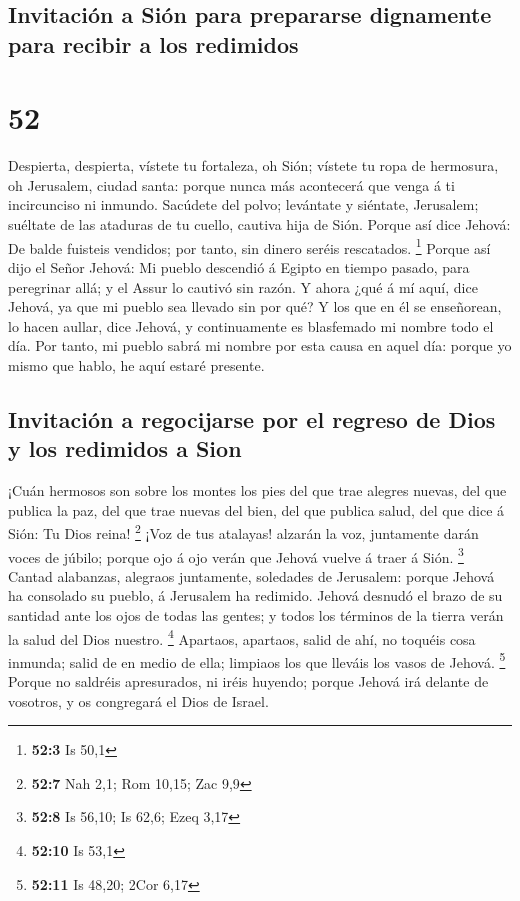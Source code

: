 \hypertarget{invitaciuxf3n-a-siuxf3n-para-prepararse-dignamente-para-recibir-a-los-redimidos}{%
\subsection{Invitación a Sión para prepararse dignamente para recibir a
los
redimidos}\label{invitaciuxf3n-a-siuxf3n-para-prepararse-dignamente-para-recibir-a-los-redimidos}}

\hypertarget{section-51}{%
\section{52}\label{section-51}}

 Despierta, despierta, vístete tu fortaleza, oh Sión;
vístete tu ropa de hermosura, oh Jerusalem, ciudad santa: porque nunca
más acontecerá que venga á ti incircunciso ni inmundo. 
Sacúdete del polvo; levántate y siéntate, Jerusalem; suéltate de las
ataduras de tu cuello, cautiva hija de Sión.  Porque así
dice Jehová: De balde fuisteis vendidos; por tanto, sin dinero seréis
rescatados. \footnote{\textbf{52:3} Is 50,1}  Porque así
dijo el Señor Jehová: Mi pueblo descendió á Egipto en tiempo pasado,
para peregrinar allá; y el Assur lo cautivó sin razón.  Y
ahora ¿qué á mí aquí, dice Jehová, ya que mi pueblo sea llevado sin por
qué? Y los que en él se enseñorean, lo hacen aullar, dice Jehová, y
continuamente es blasfemado mi nombre todo el día.  Por
tanto, mi pueblo sabrá mi nombre por esta causa en aquel día: porque yo
mismo que hablo, he aquí estaré presente.

\hypertarget{invitaciuxf3n-a-regocijarse-por-el-regreso-de-dios-y-los-redimidos-a-sion}{%
\subsection{Invitación a regocijarse por el regreso de Dios y los
redimidos a
Sion}\label{invitaciuxf3n-a-regocijarse-por-el-regreso-de-dios-y-los-redimidos-a-sion}}

 ¡Cuán hermosos son sobre los montes los pies del que trae
alegres nuevas, del que publica la paz, del que trae nuevas del bien,
del que publica salud, del que dice á Sión: Tu Dios reina! \footnote{\textbf{52:7}
  Nah 2,1; Rom 10,15; Zac 9,9}  ¡Voz de tus atalayas!
alzarán la voz, juntamente darán voces de júbilo; porque ojo á ojo verán
que Jehová vuelve á traer á Sión. \footnote{\textbf{52:8} Is 56,10; Is
  62,6; Ezeq 3,17}  Cantad alabanzas, alegraos juntamente,
soledades de Jerusalem: porque Jehová ha consolado su pueblo, á
Jerusalem ha redimido.  Jehová desnudó el brazo de su
santidad ante los ojos de todas las gentes; y todos los términos de la
tierra verán la salud del Dios nuestro. \footnote{\textbf{52:10} Is 53,1}
 Apartaos, apartaos, salid de ahí, no toquéis cosa
inmunda; salid de en medio de ella; limpiaos los que lleváis los vasos
de Jehová. \footnote{\textbf{52:11} Is 48,20; 2Cor 6,17} 
Porque no saldréis apresurados, ni iréis huyendo; porque Jehová irá
delante de vosotros, y os congregará el Dios de Israel.

